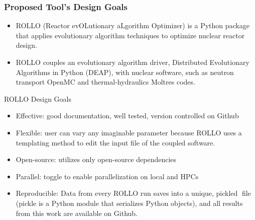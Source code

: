 \begin{frame}
    \frametitle{Proposed Tool's Design Goals}
    \begin{itemize}
        \item ROLLO (Reactor evOLutionary aLgorithm Optimizer) is a Python package 
        that applies evolutionary algorithm techniques to optimize nuclear reactor design.
        \item ROLLO couples an evolutionary algorithm driver, Distributed 
        Evolutionary Algorithms in Python (DEAP), with 
        nuclear software, such as neutron transport OpenMC and thermal-hydraulics 
        Moltres codes.
    \end{itemize}
    \begin{block}{ROLLO Design Goals}
        \begin{itemize}
            \item Effective: good documentation, well tested, version controlled 
            on Github 
            \item Flexible: user can vary any imaginable parameter because
            ROLLO uses a templating method to edit the input file of the coupled software.
            \item Open-source: utilizes only open-source dependencies 
            \item Parallel: toggle to enable parallelization on local and HPCs
            \item Reproducible: Data from every ROLLO run saves into a unique, 
            pickled file (pickle is a Python module that serializes Python 
            objects), and all results from this work are available on Github.
        \end{itemize}
    \end{block}
\end{frame}

